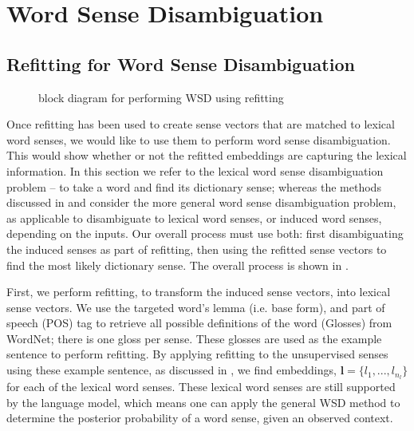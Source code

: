 \documentclass{sig-alternate}
\renewcommand{\l}{\mathbf{l}}
\begin{document}
\section{Word Sense Disambiguation}\label{lexicalWSD}

\subsection{Refitting for Word Sense Disambiguation} 
\begin{figure}
	\begin{adjustbox}{max width=\columnwidth}
		
	\end{adjustbox}
	\caption{ block diagram for performing WSD using refitting \label{WSDBlock}} 
\end{figure}
Once refitting has been used to create sense vectors that are matched to lexical word senses, we would like to use them to perform word sense disambiguation. This would show whether or not the refitted embeddings are capturing the lexical information. In this section we refer to the lexical word sense disambiguation problem -- to take a word and find its dictionary sense; whereas the methods discussed in  and  consider the more general word sense disambiguation problem, as applicable to disambiguate to lexical word senses, or induced word senses, depending on the inputs.
Our overall process must use both: first disambiguating the induced senses as part of refitting, then using the refitted sense vectors to find the most likely dictionary sense.
The overall process is shown in .

First, we perform refitting, to transform the induced sense vectors, into lexical sense vectors.
We use the targeted word's lemma (i.e. base form), and part of speech (POS) tag to retrieve all possible definitions of the word (Glosses) from WordNet; there is one gloss per sense. These glosses are used as the example sentence to perform refitting. By applying refitting to the unsupervised senses using these example sentence, as discussed in , we find embeddings, $\l=\{l_1,..., l_{n_l}\}$ for each of the lexical word senses. These lexical word senses are still supported by the language model, which means one can apply the general WSD method to determine the posterior probability of a word sense, given an observed context. 
\end{document}
